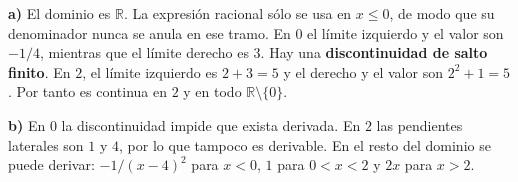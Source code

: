 \textbf{a)} El dominio es $\mathbb R$. La expresión racional
sólo se usa en $x\le0$, de modo que su denominador nunca se
anula en ese tramo. En $0$ el límite izquierdo y el valor son
$-1/4$, mientras que el límite derecho es $3$. Hay una
\textbf{discontinuidad de salto finito}. En $2$, el límite
izquierdo es $2+3=5$ y el derecho y el valor son $2^2+1=5$.
Por tanto es continua en $2$ y en todo $\mathbb R\setminus\{0\}$.

\textbf{b)} En $0$ la discontinuidad impide que exista derivada.
En $2$ las pendientes laterales son $1$ y $4$, por lo que
tampoco es derivable. En el resto del dominio se puede derivar:
$-1/(x-4)^2$ para $x<0$, $1$ para $0<x<2$ y $2x$ para $x>2$.

